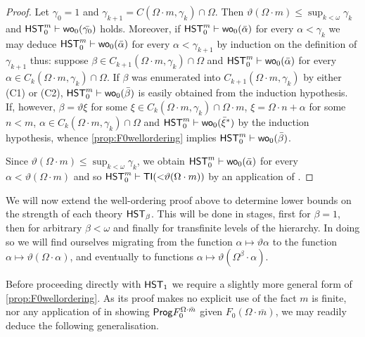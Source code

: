 \documentclass[UKenglish,cleveref,DIV=12]{scrartcl}
\theoremstyle{definition}
\theoremstyle{definition}
\begin{document}
\begin{proof}
Let $\gamma_0=1$ and $\gamma_{k+1}= C(\Omega\cdot m,\gamma_k)\cap\Omega$. Then
$\vartheta(\Omega\cdot m)\le\sup_{k<\omega}\gamma_k$ and
$\mathsf{HST}_0^m\vdash\mathsf{wo}_0(\bar{\gamma_0})$ holds. Moreover, if $\mathsf{HST}_0^m\vdash
\mathsf{wo}_0(\bar{\alpha})$ for every $\alpha<\gamma_k$ we may deduce $\mathsf{HST}_0^m\vdash
\mathsf{wo}_0(\bar{\alpha})$ for every $\alpha<\gamma_{k+1}$ by induction on the
definition of $\gamma_{k+1}$ thus: suppose $\beta\in C_{k+1}(\Omega\cdot
m,\gamma_k)\cap\Omega$ and $\mathsf{HST}_0^m\vdash \mathsf{wo}_0(\bar\alpha)$ for every
$\alpha\in C_{k}(\Omega\cdot m,\gamma_k)\cap\Omega$. If $\beta$ was enumerated
into $C_{k+1}(\Omega\cdot m,\gamma_k)$ by either (C1) or (C2),
$\mathsf{HST}_0^m\vdash\mathsf{wo}_0(\bar\beta)$ is easily obtained from the induction
hypothesis. If, however, $\beta=\vartheta\xi$ for some $\xi\in C_{k}(\Omega\cdot
m,\gamma_k)\cap\Omega\cdot m$, $\xi=\Omega\cdot n+\alpha$ for some $n<m$,
$\alpha\in C_{k}(\Omega\cdot m,\gamma_k)\cap\Omega$ and
$\mathsf{HST}_0^m\vdash\mathsf{wo}_0(\bar\xi^*)$ by the induction hypothesis, whence
\cref{prop:F0wellordering} implies $\mathsf{HST}_0^m\vdash\mathsf{wo}_0(\bar\beta)$.

Since $\vartheta(\Omega\cdot m)\le\sup_{k<\omega}\gamma_k$, we obtain
$\mathsf{HST}_0^m\vdash\mathsf{wo}_0(\bar\alpha)$ for every $\alpha<\vartheta(\Omega\cdot m)$ and
so $\mathsf{HST}_0^m\vdash\mathsf{TI}(\mathord<\vartheta(\Omega\cdot m))$ by an application of
.
\end{proof}

We will now extend the well-ordering proof above to determine lower bounds on the strength of each
theory $\mathsf{HST}_\beta$. This will be done in stages, first for $\beta=1$, then for
arbitrary $\beta<\omega$ and finally for transfinite levels of the hierarchy. In
doing so we will find ourselves migrating from the function $\alpha\mapsto\vartheta\alpha$
to the function $\alpha\mapsto\vartheta(\Omega\cdot\alpha)$,
and eventually to functions $\alpha\mapsto\vartheta(\Omega^{\beta}\cdot\alpha)$.

Before proceeding directly with $\mathsf{HST}_1$ we require a slightly more general form
of \cref{prop:F0wellordering}. As its proof makes no explicit use of the fact $m$ is finite,
nor any application of  in showing $\mathsf{Prog} F^{\Omega\cdot \bar m}_0$ given
$F_0(\Omega\cdot\bar m)$, we may readily deduce the following generalisation.
\end{document}
